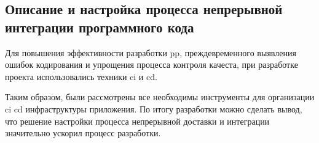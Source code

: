 \subsection{Описание и настройка процесса непрерывной интеграции программного кода}
\label{sec:testing:ci}

Для повышения эффективности разработки \gls{pp}, преждевременного выявления ошибок кодирования и упрощения процесса контроля качеста, при разработке проекта использовались техники \gls{ci} и \gls{cd}.







Таким образом, были рассмотрены все необходимы инструменты для организации \gls{ci} \gls{cd} инфраструктуры приложения. По итогу разработки можно сделать вывод, что решение настройки процесса непрерывной доставки и интеграции значительно ускорил процесс разработки.